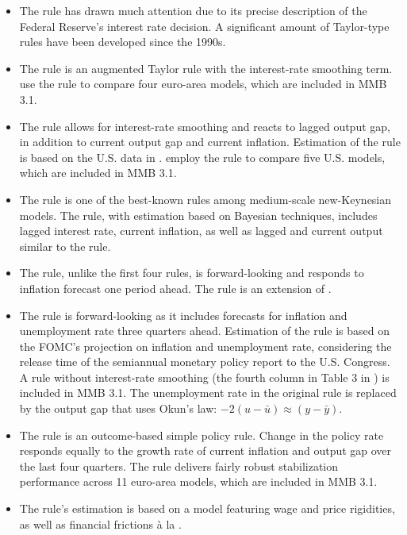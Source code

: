 \documentclass[11pt,a4paper]{article}
\begin{document}
\begin{itemize}
	\item The \cite{Taylor1993} rule has drawn much attention due to its precise description of the Federal Reserve's interest rate decision. A significant amount of Taylor-type rules have been developed since the 1990s.
	\item The \cite{GerdesmeierRoffia2004} rule is an augmented Taylor rule with the interest-rate smoothing term. \cite{KuesterWieland2010} use the rule to compare four euro-area models, which are included in MMB 3.1. 
	\item The \cite{LevinWielandWilliams2003} rule allows for interest-rate smoothing and reacts to lagged output gap, in addition to current output gap and current inflation. Estimation of the rule is based on the U.S. data in \cite{OrphanidesWieland1998}. \cite{LevinWielandWilliams2003} employ the rule to compare five U.S. models, which are included in MMB 3.1.
	\item The \cite{SmetsWouters2007} rule is one of the best-known rules among medium-scale new-Keynesian models. The rule, with estimation based on Bayesian techniques, includes lagged interest rate, current inflation, as well as lagged and current output similar to the \cite{LevinWielandWilliams2003} rule.
	\item The \cite{ChristianoEichenbaumEvans2005} rule, unlike the first four rules, is forward-looking and responds to inflation forecast one period ahead. The rule is an extension of  \cite{ClaridaGaliGertler1999}.
	\item The \cite{OrphanidesWieland2008} rule is forward-looking as it includes forecasts for inflation and unemployment rate three quarters ahead. Estimation of the rule is based on the FOMC's projection on inflation and unemployment rate, considering the release time of the semiannual monetary policy report to the U.S. Congress. A rule without interest-rate smoothing (the fourth column in Table 3 in \cite{OrphanidesWieland2008}) is included in MMB 3.1. The unemployment rate in the original rule is replaced by the output gap that uses Okun's law: $-2 (u-\bar{u}) \approx (y-\bar{y})$.
	\item The \cite{OrphanidesWieland2013} rule is an outcome-based simple policy rule. Change in the policy rate responds equally to the growth rate of current inflation and output gap over the last four quarters. The rule delivers fairly robust stabilization performance across 11 euro-area models, which are included in MMB 3.1.
	\item The \cite{CMR2014} rule's estimation is based on a model featuring wage and price rigidities, as well as financial frictions \`a la \cite{BernankeGertlerGilchrist1999}.

\end{itemize}
\end{document}
